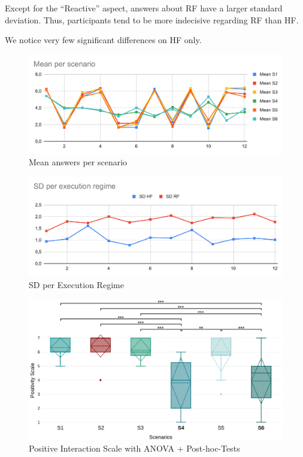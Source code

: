 Except for the ``Reactive'' aspect, answers about RF have a larger standard deviation. Thus, participants tend to be more indecisive regarding RF than HF.

We notice very few significant differences on HF only.

\begin{figure}
    \includegraphics[width=\linewidth]{images/Chapter5/Mean per scenario.pdf}
    \caption{Mean answers per scenario}
    \label{fig:mean_per_scenario}
\end{figure}

\begin{figure}
    \includegraphics[width=\linewidth]{images/Chapter5/SD per execution regime.pdf}
    \caption{SD per Execution Regime}
    \label{fig:sd_per_execution_regime}
\end{figure}


\begin{figure}
    \centering
    \includegraphics[width=\linewidth]{images/Chapter5/positive_scale.png}
    \caption{Positive Interaction Scale with ANOVA + Post-hoc-Tests}
    \label{fig:positive_scale_anova}
\end{figure}

